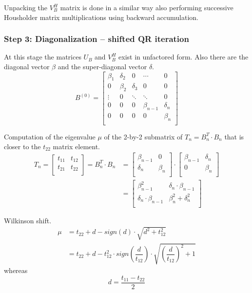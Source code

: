 Unpacking the $V_B^H$ matrix is done in a similar way also performing
successive Housholder matrix multiplications using backward
accumulation.

\subsubsection{Step 3: Diagonalization -- shifted QR iteration}

At this stage the matrices $U_B$ and $V_B^H$ exist in unfactored form.
Also there are the diagonal vector $\beta$ and the super-diagonal
vector $\delta$.
\begin{equation}
B^{(0)} = 
\begin{bmatrix}
\beta_1 & \delta_2 & 0 & \cdots & 0\\
0 & \beta_2 & \delta_3 & 0 & 0\\
\vdots & 0 & \ddots & \ddots & 0\\
0 & 0 & 0 & \beta_{n-1} & \delta_n\\
0 & 0 & 0 & 0 & \beta_n\\
\end{bmatrix}
\end{equation}

Computation of the eigenvalue $\mu$ of the 2-by-2 submatrix of $T_n =
B_n^T\cdot B_n$ that is closer to the $t_{22}$ matrix element.
\begin{align}
T_n =
\begin{bmatrix}
t_{11} & t_{12}\\
t_{21} & t_{22}\\
\end{bmatrix}
= B_n^T\cdot B_n &=
\begin{bmatrix}
\beta_{n-1} & 0\\
\delta_{n} & \beta_{n}\\
\end{bmatrix} \cdot
\begin{bmatrix}
\beta_{n-1} & \delta_{n}\\
0 & \beta_{n}\\
\end{bmatrix}\\
&=
\begin{bmatrix}
\beta_{n-1}^2 & \delta_{n}\cdot \beta_{n-1}\\
\delta_{n}\cdot \beta_{n-1} & \beta_{n}^2 + \delta_{n}^2\\
\end{bmatrix}
\end{align}

Wilkinson shift.
\begin{align}
\mu &= t_{22} + d - sign(d)\cdot \sqrt{d^2 + t_{12}^2}\\
&= t_{22} + d - t_{12}^2\cdot sign\left(\dfrac{d}{t_{12}}\right)\cdot \sqrt{\left(\dfrac{d}{t_{12}}\right)^2 + 1}
\end{align}
whereas
\begin{equation}
d = \dfrac{t_{11} - t_{22}}{2}
\end{equation}

